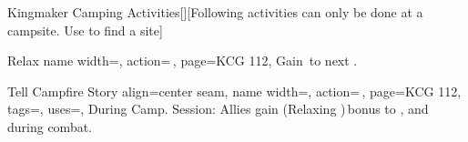 \begin{PageFront}
\begin{Tables}{\frontTableHeight}
\begin{Table}{Kingmaker Camping Activities}[][Following activities can only be done at a campsite. Use
         to find a site]
            \begin{entry}{Relax}{%
                name width=\activityLength,%
                action=\,,
                page=KCG 112,
            }
                Gain \,\Cirm to next .
            \end{entry}
            \begin{entry}{Tell Campfire Story}{%
                align=center seam,
                name width=\activityLength,%
                action=\,,
                page=KCG 112,
                tags=\Concentrate, %
                uses=\Performance,
            }
                During Camp. Session: Allies gain (Relaxing )\,\Status bonus to ,  and  during combat.\\
                 \hfill{}\hfill
            \end{entry}
        \end{Table}
    \end{Tables}%
\end{PageFront}